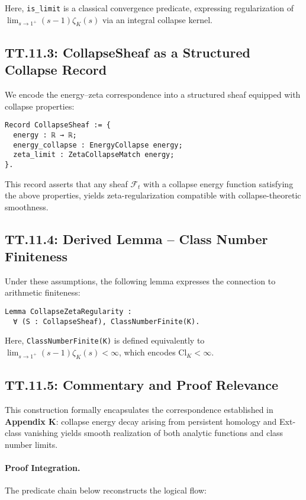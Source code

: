 \documentclass[11pt]{article}
\begin{document}
Here, \texttt{is\_limit} is a classical convergence predicate,  
expressing regularization of \( \lim_{s \to 1^+} (s-1)\zeta_K(s) \) via an integral collapse kernel.

\subsection*{TT.11.3: CollapseSheaf as a Structured Collapse Record}

We encode the energy–zeta correspondence into a structured sheaf equipped with collapse properties:

\begin{verbatim}
Record CollapseSheaf := {
  energy : ℝ → ℝ;
  energy_collapse : EnergyCollapse energy;
  zeta_limit : ZetaCollapseMatch energy;
}.
\end{verbatim}

This record asserts that any sheaf \( \mathcal{F}_t \) with a collapse energy function  
satisfying the above properties, yields zeta-regularization compatible with collapse-theoretic smoothness.

\subsection*{TT.11.4: Derived Lemma – Class Number Finiteness}

Under these assumptions, the following lemma expresses the connection to arithmetic finiteness:

\begin{verbatim}
Lemma CollapseZetaRegularity :
  ∀ (S : CollapseSheaf), ClassNumberFinite(K).
\end{verbatim}

Here, \texttt{ClassNumberFinite(K)} is defined equivalently to  
\( \lim_{s \to 1^+} (s - 1)\zeta_K(s) < ∞ \), which encodes \( \mathrm{Cl}_K < ∞ \).

\subsection*{TT.11.5: Commentary and Proof Relevance}

This construction formally encapsulates the correspondence established in \textbf{Appendix K}:  
collapse energy decay arising from persistent homology and Ext-class vanishing  
yields smooth realization of both analytic functions and class number limits.

\paragraph{Proof Integration.}
The predicate chain below reconstructs the logical flow:
\end{document}
